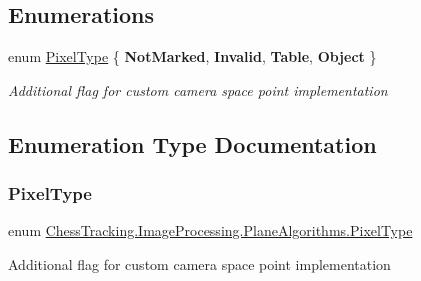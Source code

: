 \subsection*{Enumerations}
\begin{DoxyCompactItemize}
\item 
enum \mbox{\hyperlink{namespace_chess_tracking_1_1_image_processing_1_1_plane_algorithms_ac44a3bcaafd35137cad84c4d148194c1}{Pixel\+Type}} \{ {\bfseries Not\+Marked}, 
{\bfseries Invalid}, 
{\bfseries Table}, 
{\bfseries Object}
 \}
\begin{DoxyCompactList}\small\item\em Additional flag for custom camera space point implementation \end{DoxyCompactList}\end{DoxyCompactItemize}


\subsection{Enumeration Type Documentation}
\mbox{\label{namespace_chess_tracking_1_1_image_processing_1_1_plane_algorithms_ac44a3bcaafd35137cad84c4d148194c1}} 
\subsubsection{\texorpdfstring{PixelType}{PixelType}}
{\footnotesize\ttfamily enum \mbox{\hyperlink{namespace_chess_tracking_1_1_image_processing_1_1_plane_algorithms_ac44a3bcaafd35137cad84c4d148194c1}{Chess\+Tracking.\+Image\+Processing.\+Plane\+Algorithms.\+Pixel\+Type}}\hspace{0.3cm}{\ttfamily [strong]}}



Additional flag for custom camera space point implementation 

